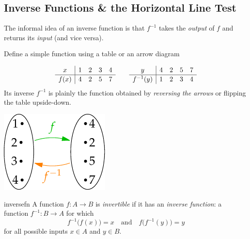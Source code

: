 \clearpage




\subsection{Inverse Functions \& the Horizontal Line Test}

The informal idea of an inverse function is that $f^{-1}$ takes the \emph{output} of $f$ and returns its \emph{input} (and vice versa).

\begin{example}{}{}
Define a simple function using a table or an arrow diagram\par
\begin{minipage}[t]{0.74\linewidth}\vspace{-17pt}
\[\def\arraystretch{1.1}\begin{array}{c|cccc}
x&1&2&3&4\\\hline
f(x)&4&2&5&7
\end{array}\qquad\begin{array}{c|cccc}
y&4&2&5&7\\\hline
f^{-1}(y)&1&2&3&4
\end{array}
\]
Its inverse $f^{-1}$ is plainly the function obtained by \emph{reversing the arrows} or flipping the table upside-down.
\end{minipage}\hfill\begin{minipage}[t]{0.25\linewidth}\vspace{-17pt}
\flushright\includegraphics{inverse-easy}
\end{minipage}
\end{example}

\begin{defn}{}{inversefn}
A function $f:A\to B$ is \emph{invertible} if it has an \emph{inverse function}: a function $f^{-1}:B\to A$ for which
\[f^{-1}\bigl(f(x)\bigr)=x\quad\text{and}\quad f\bigl(f^{-1}(y)\bigr)=y\tag{$\ast$}\]
for all possible inputs $x\in A$ and $y\in B$.
\end{defn}

